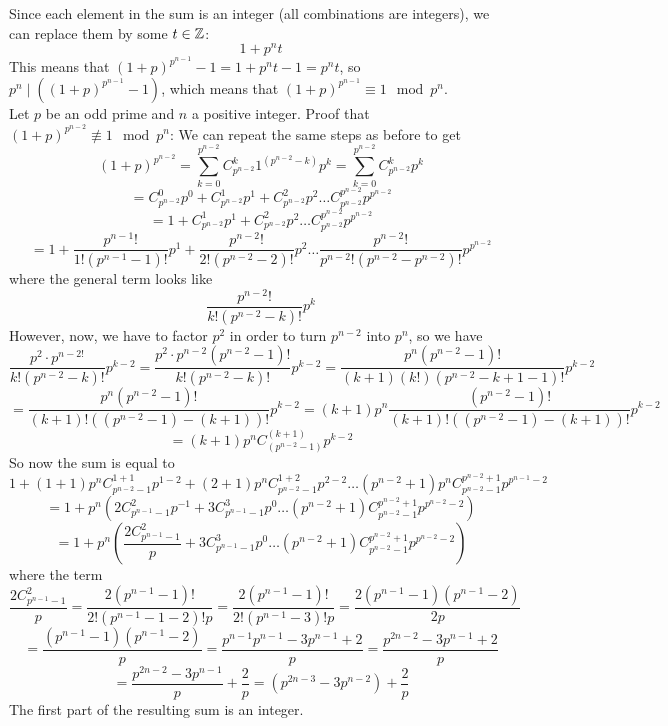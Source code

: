\documentclass[12pt]{article}
\begin{document}
    Since each element in the sum is an integer
    (all combinations are integers),
    we can replace them by some $t \in \mathbb{Z}$:
    \[ 1 + p^nt\]
    This means that $(1 + p)^{p^{n-1}} - 1 = 1 + p^nt - 1
    = p^nt$,
    so $p^n \mid ((1 + p)^{p^{n-1}} - 1)$,
    which means that $(1 + p)^{p^{n-1}} \equiv 1 \mod p^n$. \\
    Let $p$ be an odd prime and $n$ a positive integer.
    Proof that $(1 + p)^{p^{n-2}} \not\equiv 1 \mod p^n$:
    We can repeat the same steps as before to get 
    \[ (1 + p)^{p^{n-2}}
    = \sum_{k = 0}^{p^{n-2}} C_{p^{n-2}}^{k}1^{(p^{n-2} - k)}p^k
    = \sum_{k = 0}^{p^{n-2}} C_{p^{n-2}}^{k}p^k \]
    \[ = C_{p^{n-2}}^0p^0 + C_{p^{n-2}}^1p^1 + C_{p^{n-2}}^2p^{2}
    \dots C_{p^{n-2}}^{p^{n-2}}p^{p^{n-2}} \]
    \[ = 1 + C_{p^{n-2}}^1p^1 + C_{p^{n-2}}^2p^2
    \dots C_{p^{n-2}}^{p^{n-2}}p^{p^{n-2}} \]
    \[ = 1 + \dfrac{p^{n-1}!}{1!(p^{n-1} - 1)!}p^1
    + \dfrac{p^{n-2}!}{2!(p^{n-2} - 2)!}p^2 \dots
    \dfrac{p^{n-2}!}{p^{n-2}!(p^{n-2} - p^{n-2})!}p^{p^{n-2}} \]
    where the general term looks like
    \[ \dfrac{p^{n-2}!}{k!(p^{n-2} - k)!}p^k \]
    However, now, we have to factor $p^2$ in order to turn
    $p^{n-2}$ into $p^n$, so we have
    \[ \dfrac{p^2 \cdot p^{n-2!}}{k!(p^{n-2} - k)!}p^{k-2}
    = \dfrac{p^2 \cdot p^{n-2}(p^{n-2} - 1)!}{k!(p^{n-2} - k)!}p^{k-2}
    = \dfrac{p^n(p^{n-2} - 1)!}{(k+1)(k!)(p^{n-2} - k + 1 - 1)!}p^{k-2} \]
    \[ = \dfrac{p^n(p^{n-2} - 1)!}{(k + 1)!((p^{n-2} - 1)-(k + 1))!}p^{k-2}
    = (k+1)p^n \dfrac{(p^{n-2}-1)!}{(k + 1)!((p^{n-2}-1)-(k + 1))!}p^{k-2} \]
    \[ = (k+1)p^n C_{(p^{n-2} - 1)}^{(k+1)} p^{k-2} \]
    So now the sum is equal to
    \[ 1 + (1 + 1)p^nC_{p^{n-2} - 1}^{1 + 1}p^{1-2}
    + (2+1)p^nC_{p^{n-2} - 1}^{1 + 2}p^{2-2} \dots
    (p^{n-2}+1)p^nC_{p^{n-2} - 1}^{p^{n-2} + 1}p^{p^{n-1}-2} \]
    \[ = 1 + p^n(2C_{p^{n-1} - 1}^{2}p^{-1}
    + 3C_{p^{n-1} - 1}^{3}p^{0} \dots
    (p^{n-2}+1)C_{p^{n-2} - 1}^{p^{n-2} + 1}p^{p^{n-2}-2}) \]
    \[ = 1 + p^n( \dfrac{2C_{p^{n-1} - 1}^{2}}{p}
    + 3C_{p^{n-1} - 1}^{3}p^{0} \dots
    (p^{n-2}+1)C_{p^{n-2} - 1}^{p^{n-2} + 1}p^{p^{n-2}-2}) \]
    where the term
    \[ \dfrac{2C_{p^{n-1} - 1}^{2}}{p}
    = \dfrac{2(p^{n-1} - 1)!}{2!(p^{n-1} - 1 - 2)!p} 
    = \dfrac{2(p^{n-1} - 1)!}{2!(p^{n-1} - 3)!p}
    = \dfrac{2(p^{n-1} - 1)(p^{n-1} - 2)}{2p} \]
    \[ = \dfrac{(p^{n-1} - 1)(p^{n-1} - 2)}{p}
    = \dfrac{p^{n-1}p^{n-1} - 3p^{n-1} + 2}{p}
    = \dfrac{p^{2n-2} - 3p^{n-1} + 2}{p} \]
    \[ = \dfrac{p^{2n-2} - 3p^{n-1}}{p} + \dfrac{2}{p} 
    = (p^{2n-3} - 3p^{n-2}) + \dfrac{2}{p} \]
    The first part of the resulting sum is an integer.
\end{document}
